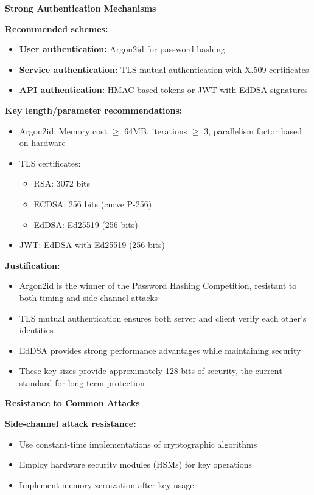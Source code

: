 \documentclass{article}
\begin{document}
\begin{enumerate}[label=\textbf{Task \arabic*:}]
\begin{tcolorbox}
		\bigskip
		\noindent\textbf{\large Strong Authentication Mechanisms}
		
		\noindent\textbf{Recommended schemes:}
		\begin{itemize}
			\item \textbf{User authentication:} Argon2id for password hashing
			\item \textbf{Service authentication:} TLS mutual authentication with X.509 certificates
			\item \textbf{API authentication:} HMAC-based tokens or JWT with EdDSA signatures
		\end{itemize}
		
		\noindent\textbf{Key length/parameter recommendations:}
		\begin{itemize}
			\item Argon2id: Memory cost $\geq$ 64MB, iterations $\geq$ 3, parallelism factor based on hardware
			\item TLS certificates: 
			\begin{itemize}
				\item RSA: 3072 bits
				\item ECDSA: 256 bits (curve P-256)
				\item EdDSA: Ed25519 (256 bits)
			\end{itemize}
			\item JWT: EdDSA with Ed25519 (256 bits)
		\end{itemize}
		
		\noindent\textbf{Justification:}
		\begin{itemize}
			\item Argon2id is the winner of the Password Hashing Competition, resistant to both timing and side-channel attacks
			\item TLS mutual authentication ensures both server and client verify each other's identities
			\item EdDSA provides strong performance advantages while maintaining security
			\item These key sizes provide approximately 128 bits of security, the current standard for long-term protection
		\end{itemize}
		
		\bigskip
		\noindent\textbf{\large Resistance to Common Attacks}
		
		\noindent\textbf{Side-channel attack resistance:}
		\begin{itemize}
			\item Use constant-time implementations of cryptographic algorithms
			\item Employ hardware security modules (HSMs) for key operations
			\item Implement memory zeroization after key usage
		\end{itemize}
		

\end{tcolorbox}
\end{enumerate}
\end{document}
